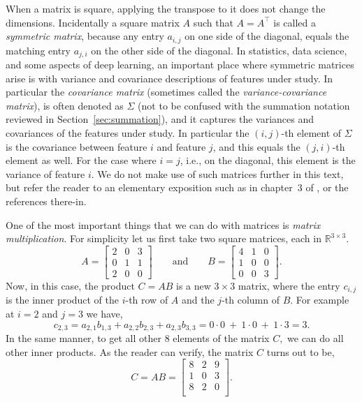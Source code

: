 When a matrix is square, applying the transpose to it does not change the dimensions. Incidentally a square matrix $A$ such that $A = A^\top$ is called a {\em symmetric matrix}, because any entry $a_{i,j}$ on one side of the diagonal, equals the matching entry $a_{j,i}$ on the other side of the diagonal. In statistics, data science, and some aspects of deep learning, an important place where symmetric matrices arise is with variance and covariance descriptions of features under study. In particular the {\em covariance matrix} (sometimes called the {\em variance-covariance matrix}), is often denoted as $\Sigma$ (not to be confused with the summation notation reviewed in Section~\ref{sec:summation}), and it captures the variances and covariances of the features under study. In particular the $(i,j)$-th element of $\Sigma$ is the covariance between feature $i$ and feature $j$, and this equals the $(j,i)$-th element as well. For the case where $i=j$, i.e., on the diagonal, this element is the variance of feature $i$. We do not make use of such matrices further in this text, but refer the reader to an elementary exposition such as in chapter~3 of \cite{nazarathy2020statistics}, or the references there-in.

One of the most important things that we can do with matrices is {\em matrix multiplication}. For simplicity let us first take two square matrices, each in ${\mathbb R}^{3 \times 3}$.
%
\begin{equation}
\label{eq:matrix-a-b-for-mult}
A = 
\begin{bmatrix}
2 & 0 &3 \\
0 & 1 & 1 \\
2 & 0 & 0
\end{bmatrix}
\qquad
\text{and}
\qquad
B = 
\begin{bmatrix}
4 & 1 &0 \\
1 & 0 & 0 \\
0 & 0 & 3
\end{bmatrix}.
\end{equation}
%
Now, in this case, the product $C= AB$ is a new $3 \times 3$ matrix, where the entry $c_{i,j}$ is the inner product of the $i$-th row of $A$ and the $j$-th column of $B$. For example at $i=2$ and $j=3$ we have,
\[
c_{2,3} = a_{2,1} b_{1,3} + a_{2,2} b_{2,3} + a_{2,3} b_{3,3} = 0\cdot 0 ~+~ 1\cdot 0 ~+~ 1\cdot 3 = 3.
\]
%
In the same manner, to get all other $8$ elements of the matrix $C,$ we can do all other inner products. As the reader can verify, the matrix $C$ turns out to be,
%
\begin{equation}
\label{eq:matrix-example}
C = A B = \begin{bmatrix}
8 & 2 & 9 \\
1 & 0 & 3 \\
8 & 2 & 0 \\
\end{bmatrix}.
\end{equation}
%

